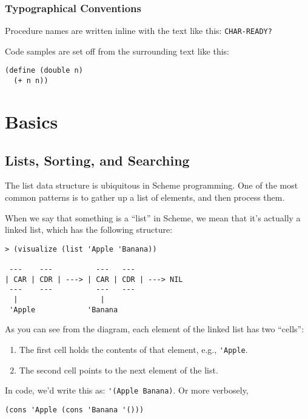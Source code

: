 \documentclass[12pt,openright,draft]{book}
\begin{document}
\section{Typographical Conventions}

Procedure names are written inline with the text like this: \verb|CHAR-READY?|

Code samples are set off from the surrounding text like this:

\begin{verbatim}
(define (double n)
  (+ n n))
\end{verbatim}

\mainmatter{}
\part{Basics}
\chapter{Lists, Sorting, and Searching}

The list data structure is ubiquitous in Scheme programming.  One of
the most common patterns is to gather up a list of elements, and
then process them.

When we say that something is a ``list'' in Scheme, we mean that it's
actually a linked list, which has the following structure:

\begin{verbatim}
> (visualize (list 'Apple 'Banana))

 ---    ---          ---   ---
| CAR | CDR | ---> | CAR | CDR | ---> NIL
 ---    ---          ---   ---
  |                   |
 'Apple            'Banana
\end{verbatim}

As you can see from the diagram, each element of the linked list has
two ``cells'':

\begin{enumerate}
\item The first cell holds the contents of that element, e.g., \verb|'Apple|.
\item The second cell points to the next element of the list.
\end{enumerate}

In code, we'd write this as: \verb|'(Apple Banana)|.  Or more
verbosely,

\begin{verbatim}
(cons 'Apple (cons 'Banana '()))
\end{verbatim}
\end{document}
